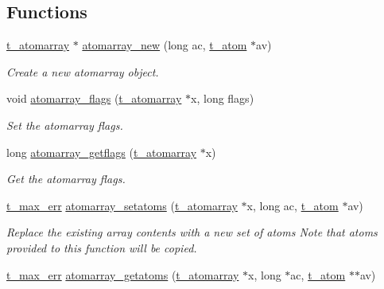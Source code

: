 \subsection*{Functions}
\begin{DoxyCompactItemize}
\item 
\hyperlink{structt__atomarray}{t\_\-atomarray} $\ast$ \hyperlink{group__atomarray_ga2896b4949e03841f4c5a71ad7f7fadf7}{atomarray\_\-new} (long ac, \hyperlink{structt__atom}{t\_\-atom} $\ast$av)
\begin{DoxyCompactList}\small\item\em Create a new atomarray object. \item\end{DoxyCompactList}\item 
void \hyperlink{group__atomarray_gad99be67bb7fafb7987412ee8fc2802f0}{atomarray\_\-flags} (\hyperlink{structt__atomarray}{t\_\-atomarray} $\ast$x, long flags)
\begin{DoxyCompactList}\small\item\em Set the atomarray flags. \item\end{DoxyCompactList}\item 
long \hyperlink{group__atomarray_gae784ffaf3fce1cd4967046faf4c7a377}{atomarray\_\-getflags} (\hyperlink{structt__atomarray}{t\_\-atomarray} $\ast$x)
\begin{DoxyCompactList}\small\item\em Get the atomarray flags. \item\end{DoxyCompactList}\item 
\hyperlink{group__datatypes_ga73edaae82b318855cc09fac994918165}{t\_\-max\_\-err} \hyperlink{group__atomarray_ga52b68a97eb1bb7f97411715401d9d2ad}{atomarray\_\-setatoms} (\hyperlink{structt__atomarray}{t\_\-atomarray} $\ast$x, long ac, \hyperlink{structt__atom}{t\_\-atom} $\ast$av)
\begin{DoxyCompactList}\small\item\em Replace the existing array contents with a new set of atoms Note that atoms provided to this function will be {\itshape copied\/}. \item\end{DoxyCompactList}\item 
\hyperlink{group__datatypes_ga73edaae82b318855cc09fac994918165}{t\_\-max\_\-err} \hyperlink{group__atomarray_ga28824a30f15ddaec8b1a323f285fbe85}{atomarray\_\-getatoms} (\hyperlink{structt__atomarray}{t\_\-atomarray} $\ast$x, long $\ast$ac, \hyperlink{structt__atom}{t\_\-atom} $\ast$$\ast$av)
$$
\end{DoxyCompactItemize}
